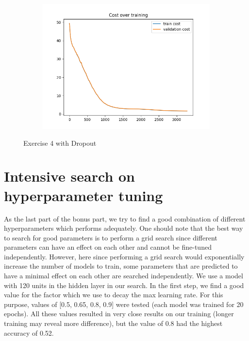 \documentclass[a4paper]{article}
\begin{document}
\begin{figure}[h]
\begin{subfigure}{0.3\textwidth}
		\caption{}
	\end{subfigure}
	\begin{subfigure}{0.3\textwidth}
		\centering
		\includegraphics[width=\linewidth]{images/100_node_model_cost.png}
		\caption{}
	\end{subfigure}
	\caption{Exercise 4 with Dropout}
	\label{fig:big}
\end{figure}

\section{Intensive search on hyperparameter tuning}

As the last part of the bonus part, we try to find a good combination of different hyperparameters which performs adequately. One should note that the best way to search for good parameters is to perform a grid search since different parameters can have an effect on each other and cannot be fine-tuned independently. However, here since performing a grid search would exponentially increase the number of models to train, some parameters that are predicted to have a minimal effect on each other are searched independently. We use a model with 120 units in the hidden layer in our search.
In the first step, we find a good value for the factor which we use to decay the max learning rate. For this purpose, values of [0.5, 0.65, 0.8, 0.9] were tested (each model was trained for 20 epochs).  All these values resulted in very close results on our training (longer training may reveal more difference), but the value of 0.8 had the highest accuracy of 0.52.
\end{document}

